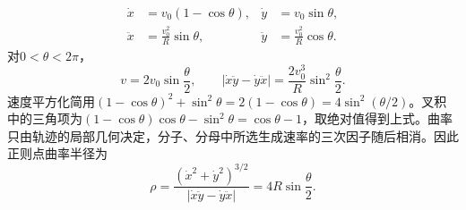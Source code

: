 \documentclass[UTF8,fontset=fandol,a4paper,11pt]{ctexart}
\begin{document}
\[
\begin{aligned}
\dot x&=v_0(1-\cos\theta),&
\dot y&=v_0\sin\theta,\\
\ddot x&=\frac{v_0^2}{R}\sin\theta,&
\ddot y&=\frac{v_0^2}{R}\cos\theta.
\end{aligned}
\]
对$0<\theta<2\pi$，
\[
v=2v_0\sin\frac\theta2,\qquad
|\dot x\ddot y-\dot y\ddot x|
=\frac{2v_0^3}{R}\sin^2\frac\theta2.
\]
速度平方化简用$(1-\cos\theta)^2+\sin^2\theta=2(1-\cos\theta)=4\sin^2(\theta/2)$。叉积中的三角项为$(1-\cos\theta)\cos\theta-\sin^2\theta=\cos\theta-1$，取绝对值得到上式。曲率只由轨迹的局部几何决定，分子、分母中所选生成速率的三次因子随后相消。因此正则点曲率半径为
\[
\boxed{\rho=
\frac{(\dot x^2+\dot y^2)^{3/2}}
{|\dot x\ddot y-\dot y\ddot x|}
=4R\sin\frac\theta2}.
\]
\begin{center}\begin{minipage}{.98\linewidth}\centering
\begin{tikzpicture}[scale=.8,transform shape]

\end{tikzpicture}
\end{minipage}
\end{center}
\end{document}
